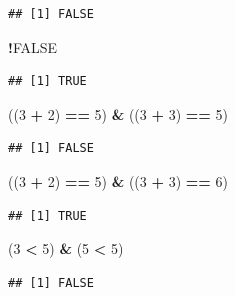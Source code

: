 \documentclass[]{book}
\newenvironment{Shaded}{\begin{snugshade}}{\end{snugshade}}
\newcommand{\DecValTok}[1]{\textcolor[rgb]{0.00,0.00,0.81}{#1}}
\newcommand{\StringTok}[1]{\textcolor[rgb]{0.31,0.60,0.02}{#1}}
\newcommand{\OtherTok}[1]{\textcolor[rgb]{0.56,0.35,0.01}{#1}}
\newcommand{\OperatorTok}[1]{\textcolor[rgb]{0.81,0.36,0.00}{\textbf{#1}}}
\newcommand{\NormalTok}[1]{#1}
\begin{document}
\begin{verbatim}
## [1] FALSE
\end{verbatim}

\begin{Shaded}
\begin{Highlighting}[]
\OperatorTok{!}\OtherTok{FALSE}
\end{Highlighting}
\end{Shaded}

\begin{verbatim}
## [1] TRUE
\end{verbatim}

\begin{Shaded}
\begin{Highlighting}[]
\NormalTok{((}\DecValTok{3} \OperatorTok{+}\StringTok{ }\DecValTok{2}\NormalTok{) }\OperatorTok{==}\StringTok{ }\DecValTok{5}\NormalTok{) }\OperatorTok{&}\StringTok{ }\NormalTok{((}\DecValTok{3} \OperatorTok{+}\StringTok{ }\DecValTok{3}\NormalTok{) }\OperatorTok{==}\StringTok{ }\DecValTok{5}\NormalTok{)}
\end{Highlighting}
\end{Shaded}

\begin{verbatim}
## [1] FALSE
\end{verbatim}

\begin{Shaded}
\begin{Highlighting}[]
\NormalTok{((}\DecValTok{3} \OperatorTok{+}\StringTok{ }\DecValTok{2}\NormalTok{) }\OperatorTok{==}\StringTok{ }\DecValTok{5}\NormalTok{) }\OperatorTok{&}\StringTok{ }\NormalTok{((}\DecValTok{3} \OperatorTok{+}\StringTok{ }\DecValTok{3}\NormalTok{) }\OperatorTok{==}\StringTok{ }\DecValTok{6}\NormalTok{)}
\end{Highlighting}
\end{Shaded}

\begin{verbatim}
## [1] TRUE
\end{verbatim}

\begin{Shaded}
\begin{Highlighting}[]
\NormalTok{(}\DecValTok{3} \OperatorTok{<}\StringTok{ }\DecValTok{5}\NormalTok{) }\OperatorTok{&}\StringTok{ }\NormalTok{(}\DecValTok{5} \OperatorTok{<}\StringTok{ }\DecValTok{5}\NormalTok{)}
\end{Highlighting}
\end{Shaded}

\begin{verbatim}
## [1] FALSE
\end{verbatim}
\end{document}
